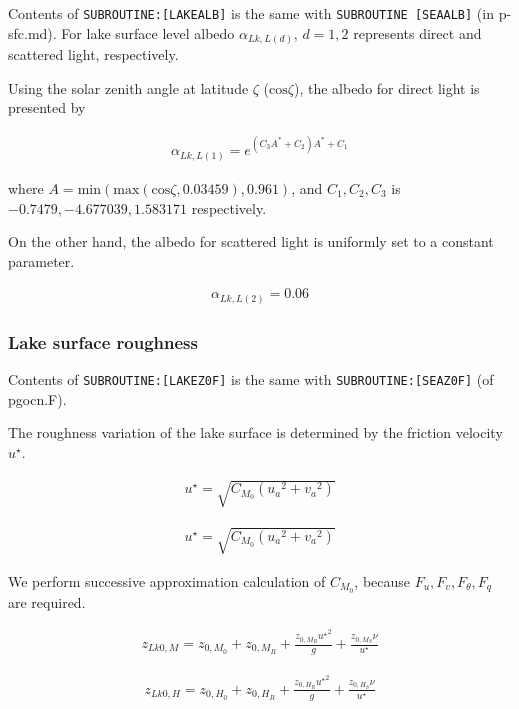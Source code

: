 Contents of \texttt{SUBROUTINE:{[}LAKEALB{]}} is the same with
\texttt{SUBROUTINE\ {[}SEAALB{]}} (in p-sfc.md). For lake surface level
albedo \(\alpha_{Lk,L(d)}\), \(d=1,2\) represents direct and scattered
light, respectively.

Using the solar zenith angle at latitude \(\zeta\)
(\(\mathrm{cos}\zeta\)), the albedo for direct light is presented by

\begin{eqnarray}
    \alpha_{Lk,L(1)} = e^{(C_3A^* + C_2) A^* +C_1}
\end{eqnarray}

where
\(A = \mathrm{min}(\mathrm{max}(\mathrm{cos}\zeta,0.03459),0.961)\), and
\(C_1, C_2, C_3\) is \(-0.7479, -4.677039, 1.583171\) respectively.

On the other hand, the albedo for scattered light is uniformly set to a
constant parameter.

\begin{eqnarray}
    \alpha_{Lk,L(2)} = 0.06
\end{eqnarray}

\hypertarget{lake-surface-roughness}{%
\subsubsection{Lake surface roughness}\label{lake-surface-roughness}}

Contents of \texttt{SUBROUTINE:{[}LAKEZ0F{]}} is the same with
\texttt{SUBROUTINE:{[}SEAZ0F{]}} (of pgocn.F).

The roughness variation of the lake surface is determined by the
friction velocity \(u^\star\).

\begin{eqnarray}
u^{\star} = \sqrt{C_{M_0} ({u_a}^2  +{v_a}^2)}
\end{eqnarray}

\begin{eqnarray}
u^{\star} = \sqrt{C_{M_0} ({u_a}^2  +{v_a}^2)}
\end{eqnarray}

We perform successive approximation calculation of \({C_{M_0}}\),
because \(F_u,F_v,F_\theta,F_q\) are required.

\begin{eqnarray}
    z_{Lk0,M} = z_{0,M_0} + z_{0,M_R} + \frac{z_{0,M_R} {u^\star }^2 }{g} + \frac{z_{0,M_S}\nu }{u^\star}
\end{eqnarray}

\begin{eqnarray}
    z_{Lk0,H} = z_{0,H_0} + z_{0,H_R} + \frac{z_{0,H_R} {u^\star }^2 }{g} + \frac{z_{0,H_S}\nu }{u^\star}
\end{eqnarray}

